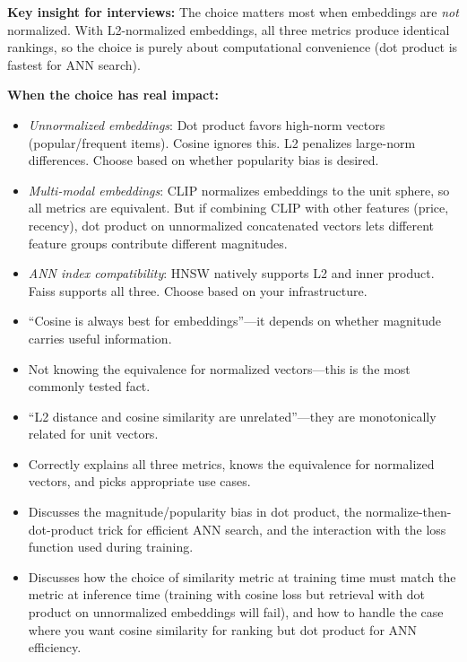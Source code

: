 \begin{interviewq}
\textbf{Key insight for interviews:} The choice matters most when embeddings are \textit{not} normalized. With L2-normalized embeddings, all three metrics produce identical rankings, so the choice is purely about computational convenience (dot product is fastest for ANN search).

\textbf{When the choice has real impact:}
\begin{itemize}
    \item \textit{Unnormalized embeddings}: Dot product favors high-norm vectors (popular/frequent items). Cosine ignores this. L2 penalizes large-norm differences. Choose based on whether popularity bias is desired.
    \item \textit{Multi-modal embeddings}: CLIP normalizes embeddings to the unit sphere, so all metrics are equivalent. But if combining CLIP with other features (price, recency), dot product on unnormalized concatenated vectors lets different feature groups contribute different magnitudes.
    \item \textit{ANN index compatibility}: HNSW natively supports L2 and inner product. Faiss supports all three. Choose based on your infrastructure.
\end{itemize}

\redflags
\begin{itemize}
    \item ``Cosine is always best for embeddings''---it depends on whether magnitude carries useful information.
    \item Not knowing the equivalence for normalized vectors---this is the most commonly tested fact.
    \item ``L2 distance and cosine similarity are unrelated''---they are monotonically related for unit vectors.
\end{itemize}


\goodgreat
\begin{itemize}
    \item {} Correctly explains all three metrics, knows the equivalence for normalized vectors, and picks appropriate use cases.
    \item {} Discusses the magnitude/popularity bias in dot product, the normalize-then-dot-product trick for efficient ANN search, and the interaction with the loss function used during training.
    \item {} Discusses how the choice of similarity metric at training time must match the metric at inference time (training with cosine loss but retrieval with dot product on unnormalized embeddings will fail), and how to handle the case where you want cosine similarity for ranking but dot product for ANN efficiency.
\end{itemize}


\end{interviewq}

